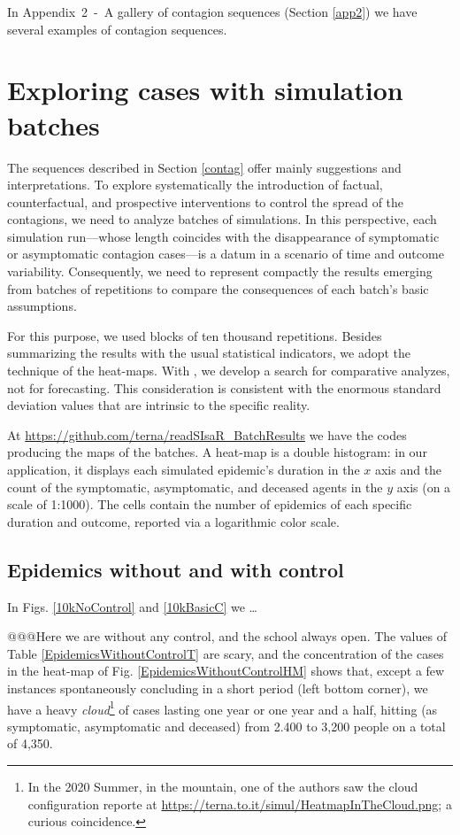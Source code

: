 \documentclass[graybox]{svmult}
\begin{document}
In Appendix~2~-~A gallery of contagion sequences (Section \ref{app2}) we have several examples of contagion sequences.

\section{Exploring cases with simulation batches}
\label{exploring}

The sequences described in Section \ref{contag} offer mainly suggestions and interpretations. To explore systematically the introduction of factual, counterfactual, and prospective interventions to control the spread of the contagions, we need to analyze batches of simulations. In this perspective, each simulation run---whose length coincides with the disappearance of symptomatic or asymptomatic contagion cases---is a datum in a scenario of time and outcome variability. Consequently, we need to represent compactly the results emerging from batches of repetitions to compare the consequences of each batch's basic assumptions. 

For this purpose, we used blocks of ten thousand repetitions. Besides summarizing the results with the usual statistical indicators, we adopt the technique of the heat-maps. With \cite{steinmann2020don}, we develop a search for comparative analyzes, not for forecasting. This consideration is consistent with the enormous standard deviation values that are intrinsic to the specific reality. 

At \href{https://github.com/terna/readSIsaR\_BatchResults}{https://github.com/terna/readSIsaR\_BatchResults} we have the codes producing the maps of the batches. A heat-map is a double histogram: in our application, it displays each simulated epidemic's duration in the $x$ axis and the count of the symptomatic, asymptomatic, and deceased agents in the $y$ axis (on a scale of 1:1000). The cells contain the number of epidemics of each specific duration and outcome, reported via a logarithmic color scale.

\subsection{Epidemics without and with control}
\label{withoutWith}

In Figs. \ref{10kNoControl} and \ref{10kBasicC} we \ldots

@@@Here we are without any control, and the school always open. The values of Table \ref{EpidemicsWithoutControlT} are scary, and the concentration of the cases in the heat-map of Fig. \ref{EpidemicsWithoutControlHM} shows that, except a few instances spontaneously concluding in a short period (left bottom corner), we have a heavy \emph{cloud}\footnote{In the 2020 Summer, in the mountain, one of the authors saw the cloud configuration reporte at \url{https://terna.to.it/simul/HeatmapInTheCloud.png}; a curious coincidence.} of cases lasting one year or one year and a half, hitting (as symptomatic, asymptomatic and deceased) from 2.400 to 3,200 people on a total of 4,350.
\end{document}
